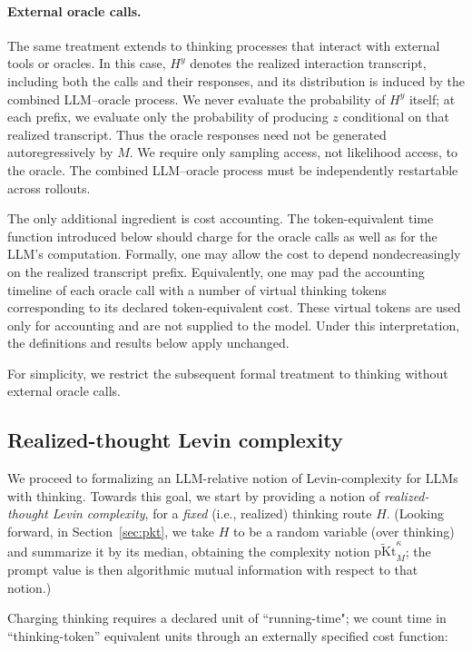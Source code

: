 \documentclass[letterpaper]{article} %
\theoremstyle{definition}
\theoremstyle{remark}
\newcommand{\pKt}{\mathrm{pKt}}
\newcommand{\pKtt}{\widetilde{\pKt}}
\begin{document}
\paragraph{External oracle calls.}
The same treatment extends to thinking processes that interact with external
tools or oracles. In this case, \(H^y\) denotes the realized interaction
transcript, including both the calls and their responses, and its distribution
is induced by the combined LLM--oracle process. We never evaluate the
probability of \(H^y\) itself; at each prefix, we evaluate only the probability
of producing \(z\) conditional on that realized transcript. Thus the oracle
responses need not be generated autoregressively by \(M\).
We require only sampling access, not likelihood access, to the oracle.
The combined LLM--oracle process must be independently restartable across
rollouts.

The only additional ingredient is cost accounting. The token-equivalent time
function introduced below should charge for the oracle calls as well as for the
LLM's computation. Formally, one may allow the cost to depend
nondecreasingly on the realized transcript prefix. Equivalently, one may pad
the accounting timeline of each oracle call with a number of virtual thinking
tokens corresponding to its declared token-equivalent cost. These virtual
tokens are used only for accounting and are not supplied to the model. Under
this interpretation, the definitions and results below apply unchanged.

For simplicity, we restrict the subsequent formal treatment to thinking without external oracle calls.

\subsection{Realized-thought Levin complexity}\label{sec:cost}
We proceed to formalizing an LLM-relative notion of Levin-complexity \cite{Levin73} for LLMs with thinking.
Towards this goal, we start by providing a notion of \emph{realized-thought
Levin complexity}, for a \emph{fixed} (i.e., realized) thinking route $H$. (Looking forward, in Section~\ref{sec:pkt}, we take
$H$ to be a random variable (over thinking) and summarize it by its median, obtaining the
complexity notion $\pKtt^{\kappa}_M$; the prompt value is then algorithmic
mutual information with respect to that notion.)

Charging thinking requires a declared unit of ``running-time"; we count time in
``thinking-token'' equivalent units through an externally specified cost
function:
\end{document}
